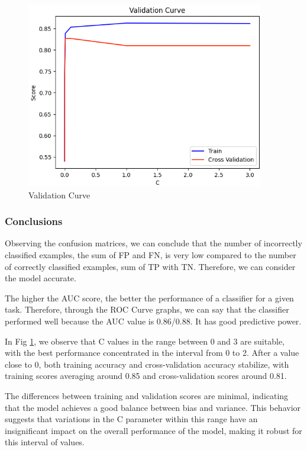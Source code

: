 \begin{figure}[H]
    \centering
    \includegraphics[width=0.75\linewidth]{images/validation_curve_log_reg.png}
    \caption{Validation Curve}
    \label{fig:ValidationCurveLogReg}
\end{figure}

\subsubsection{Conclusions}
Observing the confusion matrices, we can conclude that the number of incorrectly classified examples, the sum of \acrfull{FP} and \acrfull{FN}, is very low compared to the number of correctly classified examples, sum of \acrfull{TP} with \acrfull{TN}. Therefore, we can consider the model accurate.

The higher the AUC score, the better the performance of a classifier for a given task. Therefore, through the ROC Curve graphs, we can say that the classifier performed well because the AUC value is 0.86/0.88. It has good predictive power.

In Fig \ref{fig:ValidationCurveLogReg}, we observe that C values in the range between 0 and 3 are suitable, with the best performance concentrated in the interval from 0 to 2. After a value close to 0, both training accuracy and cross-validation accuracy stabilize, with training scores averaging around 0.85 and cross-validation scores around 0.81.

The differences between training and validation scores are minimal, indicating that the model achieves a good balance between bias and variance. This behavior suggests that variations in the C parameter within this range have an insignificant impact on the overall performance of the model, making it robust for this interval of values.

